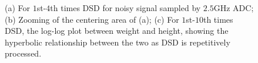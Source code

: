 \begin{figure}
  \caption{(a) For $1$st-$4$th times DSD for noisy signal sampled by
    $2.5$GHz ADC; (b) Zooming of the centering area of (a); (c) For
    $1$st-$10$th times DSD, the log-log plot between weight and
    height, showing the hyperbolic relationship between the two as DSD
    is repetitively processed.}
  \label{diff of noise}
\end{figure}

